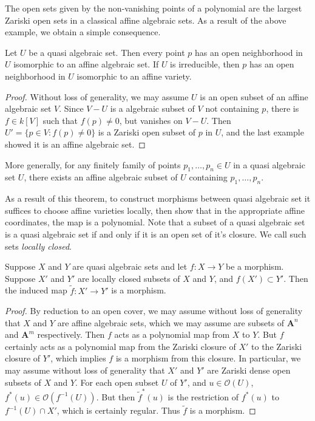 The open sets given by the non-vanishing points of a polynomial are the largest Zariski open sets in a classical affine algebraic sets. As a result of the above example, we obtain a simple consequence.

\begin{theorem}
    Let $U$ be a quasi algebraic set. Then every point $p$ has an open neighborhood in $U$ isomorphic to an affine algebraic set. If $U$ is irreducible, then $p$ has an open neighborhood in $U$ isomorphic to an affine variety.
\end{theorem}
\begin{proof}
    Without loss of generality, we may assume $U$ is an open subset of an affine algebraic set $V$. Since $V - U$ is a algebraic subset of $V$ not containing $p$, there is $f \in k[V]$ such that $f(p) \neq 0$, but vanishes on $V - U$. Then $U' = \{ p \in V : f(p) \neq 0 \}$ is a Zariski open subset of $p$ in $U$, and the last example showed it is an affine algebraic set.
\end{proof}

\begin{remark}
    More generally, for any finitely family of points $p_1,\dots,p_n \in U$ in a quasi algebraic set $U$, there exists an affine algebraic subset of $U$ containing $p_1,\dots,p_n$.
\end{remark}

As a result of this theorem, to construct morphisms between quasi algebraic set it suffices to choose affine varieties locally, then show that in the appropriate affine coordinates, the map is a polynomial. Note that a subset of a quasi algebraic set is a quasi algebraic set if and only if it is an open set of it's closure. We call such sets \emph{locally closed}.

\begin{theorem}
    Suppose $X$ and $Y$ are quasi algebraic sets and let $f: X \to Y$ be a morphism. Suppose $X'$ and $Y'$ are locally closed subsets of $X$ and $Y$, and $f(X') \subset Y'$. Then the induced map $\tilde{f}: X' \to Y'$ is a morphism.
\end{theorem}
\begin{proof}
    By reduction to an open cover, we may assume without loss of generality that $X$ and $Y$ are affine algebraic sets, which we may assume are subsets of $\mathbf{A}^n$ and $\mathbf{A}^m$ respectively. Then $f$ acts as a polynomial map from $X$ to $Y$. But $f$ certainly acts as a polynomial map from the Zariski closure of $X'$ to the Zariski closure of $Y'$, which implies $f$ is a morphism from this closure. In particular, we may assume without loss of generality that $X'$ and $Y'$ are Zariski dense open subsets of $X$ and $Y$. For each open subset $U$ of $Y'$, and $u \in \mathcal{O}(U)$, $f^*(u) \in \mathcal{O}(f^{-1}(U))$. But then $\tilde{f}^*(u)$ is the restriction of $f^*(u)$ to $f^{-1}(U) \cap X'$, which is certainly regular. Thus $\tilde{f}$ is a morphism.
\end{proof}

